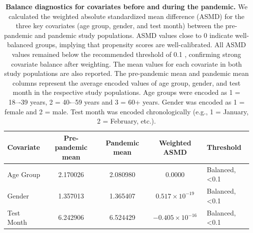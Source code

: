 \documentclass[12pt]{article}
\begin{document}
\begin{appendices}
\newpage

\begin{table}
    \centering
\caption[Balance diagnostics for covariates before and during the pandemic]{\textbf{Balance diagnostics for covariates before and during the pandemic.} We calculated the weighted absolute standardized mean difference (ASMD) for the three key covariates (age group, gender, and test month) between the pre-pandemic and pandemic study populations. ASMD values close to 0 indicate well-balanced groups, implying that propensity scores are well-calibrated. All ASMD values remained below the recommended threshold of 0.1 \cite{Austin2009}, confirming strong covariate balance after weighting. The mean values for each covariate in both study populations are also reported. The pre-pandemic mean and pandemic mean columns represent the average encoded values of age group, gender, and test month in the respective study populations. Age groups were encoded as 1 = 18–-39 years, 2 = 40-–59 years and 3 = 60+ years. Gender was encoded as 1 = female and 2 = male. Test month was encoded chronologically (e.g., 1 = January, 2 = February, etc.).}
\footnotesize
\label{supptab:ignorability}
    \begin{tabular}{|l|c|c|c|l|}
    \hline
    \rowcolor{orange!20} \textbf{Covariate} & \textbf{Pre-pandemic mean} & \textbf{Pandemic mean} & \textbf{Weighted ASMD} & \textbf{Threshold} \\ \hline 
    Age Group & 2.170026 & 2.080980 & 0.0000 & Balanced, <0.1 \\ \hline 
    Gender & 1.357013 & 1.365407 & $0.517 \times 10^{-19}$ & Balanced, <0.1 \\ \hline 
    Test Month & 6.242906 & 6.524429 & $-0.405 \times 10^{-16}$ & Balanced, <0.1 \\ \hline
    \end{tabular}
\end{table}


\end{appendices}
\end{document}
